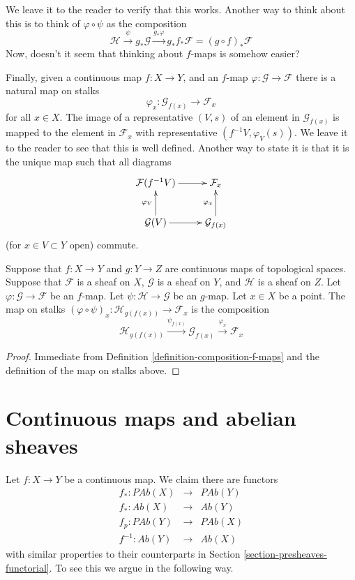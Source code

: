 \noindent
We leave it to the reader to verify that this works.
Another way to think about this is to think of
$\varphi \circ \psi$ as the composition
$$
\mathcal{H}
\xrightarrow{\psi}
g_*\mathcal{G}
\xrightarrow{g_*\varphi}
g_* f_* \mathcal{F} = (g \circ f)_* \mathcal{F}
$$
Now, doesn't it seem that thinking about $f$-maps is somehow
easier?

\medskip\noindent
Finally, given a continuous map $f : X \to Y$, and an
$f$-map $\varphi : \mathcal{G} \to \mathcal{F}$ there is
a natural map on stalks
$$
\varphi_x : \mathcal{G}_{f(x)} \longrightarrow \mathcal{F}_x
$$
for all $x \in X$. The image of a representative $(V, s)$
of an element in $\mathcal{G}_{f(x)}$ is mapped to the
element in $\mathcal{F}_x$ with representative $(f^{-1}V,
\varphi_V(s))$. We leave it to the reader to see that this
is well defined. Another way to state it is that it is the
unique map such that all diagrams
$$
\xymatrix{
\mathcal{F}(f^{-1}V) \ar[r] &
\mathcal{F}_{x} \\
\mathcal{G}(V) \ar[r] \ar[u]^{\varphi_V} &
\mathcal{G}_{f(x)} \ar[u]^{\varphi_x}
}
$$
(for $x \in V \subset Y$ open) commute.

\begin{lemma}
\label{lemma-compose-f-maps-stalks}
Suppose that $f : X \to Y$ and $g : Y \to Z$ are continuous
maps of topological spaces. Suppose that $\mathcal{F}$ is
a sheaf on $X$, $\mathcal{G}$ is a sheaf on $Y$, and
$\mathcal{H}$ is a sheaf on $Z$.
Let $\varphi : \mathcal{G} \to \mathcal{F}$ be an $f$-map.
Let $\psi : \mathcal{H} \to \mathcal{G}$ be an $g$-map.
Let $x \in X$ be a point. The map on stalks
$(\varphi \circ \psi)_x : \mathcal{H}_{g(f(x))}
\to \mathcal{F}_x$ is the composition
$$
\mathcal{H}_{g(f(x))}
\xrightarrow{\psi_{f(x)}}
\mathcal{G}_{f(x)}
\xrightarrow{\varphi_x}
\mathcal{F}_x
$$
\end{lemma}

\begin{proof}
Immediate from Definition \ref{definition-composition-f-maps}
and the definition of the map on stalks above.
\end{proof}



\section{Continuous maps and abelian sheaves}
\label{section-abelian-presheaves-functorial}

\noindent
Let $f : X \to Y$ be a continuous map.
We claim there are functors
\begin{eqnarray*}
f_* : \textit{PAb}(X) & \longrightarrow & \textit{PAb}(Y) \\
f_* : \textit{Ab}(X) & \longrightarrow & \textit{Ab}(Y) \\
f_p : \textit{PAb}(Y) & \longrightarrow & \textit{PAb}(X) \\
f^{-1} : \textit{Ab}(Y) & \longrightarrow & \textit{Ab}(X)
\end{eqnarray*}
with similar properties to their counterparts in 
Section \ref{section-presheaves-functorial}.
To see this we argue in the following way.

